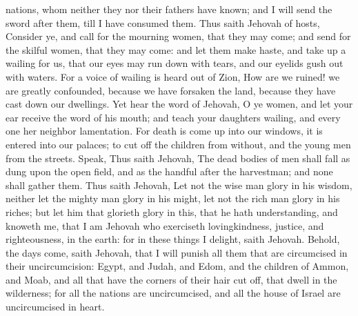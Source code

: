 nations, whom neither they nor their fathers have known; and I will send the sword after them, till I have consumed them.  Thus saith Jehovah of hosts, Consider ye, and call for the mourning women, that they may come; and send for the skilful women, that they may come: and let them make haste, and take up a wailing for us, that our eyes may run down with tears, and our eyelids gush out with waters. For a voice of wailing is heard out of Zion, How are we ruined! we are greatly confounded, because we have forsaken the land, because they have cast down our dwellings. Yet hear the word of Jehovah, O ye women, and let your ear receive the word of his mouth; and teach your daughters wailing, and every one her neighbor lamentation. For death is come up into our windows, it is entered into our palaces; to cut off the children from without, and the young men from the streets. Speak, Thus saith Jehovah, The dead bodies of men shall fall as dung upon the open field, and as the handful after the harvestman; and none shall gather them.  Thus saith Jehovah, Let not the wise man glory in his wisdom, neither let the mighty man glory in his might, let not the rich man glory in his riches; but let him that glorieth glory in this, that he hath understanding, and knoweth me, that I am Jehovah who exerciseth lovingkindness, justice, and righteousness, in the earth: for in these things I delight, saith Jehovah.  Behold, the days come, saith Jehovah, that I will punish all them that are circumcised in their uncircumcision: Egypt, and Judah, and Edom, and the children of Ammon, and Moab, and all that have the corners of their hair cut off, that dwell in the wilderness; for all the nations are uncircumcised, and all the house of Israel are uncircumcised in heart. 

